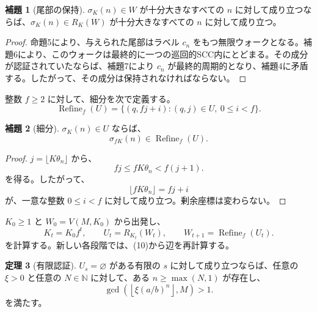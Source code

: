 \documentclass[11pt,reqno]{amsart}
\theoremstyle{definition}
\newtheorem{theorem}{定理}
\newtheorem{lemma}[theorem]{補題}
\theoremstyle{definition}
\theoremstyle{remark}
\begin{document}
\begin{samepage}
\begin{lemma}[尾部の保持]\leavevmode\label{thm:8}
\(\sigma_K(n)\in W\) が十分大きなすべての \(n\) に対して成り立つならば、\(\sigma_K(n)\in R_K(W)\) が十分大きなすべての \(n\) に対して成り立つ。
\label{thm-end:8}
\end{lemma}
\end{samepage}

\begin{proof}\leavevmode\label{proof:8}
命題5により、与えられた尾部はラベル \(c_n\) をもつ無限ウォークとなる。補題6により、このウォークは最終的に一つの巡回的SCC内にとどまる。その成分が認証されていたならば、補題7により \(c_n\) が最終的周期的となり、補題4に矛盾する。したがって、その成分は保持されなければならない。\qedhere
\end{proof}

整数 \(f\ge2\) に対して、細分を次で定義する。
\[
\operatorname{Refine}_f(U)
=\{(q,fj+i):(q,j)\in U,\ 0\le i<f\}.
\tag{16}\label{eq:16}
\]

\begin{samepage}
\begin{lemma}[細分]\leavevmode\label{thm:9}
\(\sigma_K(n)\in U\) ならば、
\[
\sigma_{fK}(n)\in\operatorname{Refine}_f(U).
\]
\label{thm-end:9}
\end{lemma}
\end{samepage}

\begin{proof}\leavevmode\label{proof:9}
\(j=\lfloor K\theta_n\rfloor\) から、
\[
fj\le fK\theta_n<f(j+1).
\]
を得る。したがって、
\[
\lfloor fK\theta_n\rfloor=fj+i
\]
が、一意な整数 \(0\le i<f\) に対して成り立つ。剰余座標は変わらない。\qedhere
\end{proof}

\(K_0\ge1\) と \(W_0=V(M,K_0)\) から出発し、
\[
K_t=K_0f^t,\qquad U_t=R_{K_t}(W_t),\qquad
W_{t+1}=\operatorname{Refine}_f(U_t).
\tag{17}\label{eq:17}
\]
を計算する。新しい各段階では、(10)から辺を再計算する。

\begin{samepage}
\begin{theorem}[有限認証]\leavevmode\label{thm:10}
\(U_s=\varnothing\) がある有限の \(s\) に対して成り立つならば、任意の \(\xi>0\) と任意の \(N\in\mathbb N\) に対して、ある \(n\ge\max(N,1)\) が存在し、
\[
\gcd\!\left(\left\lfloor\xi(a/b)^n\right\rfloor,M\right)>1.
\tag{18}\label{eq:18}
\]
を満たす。
\label{thm-end:10}
\end{theorem}
\end{samepage}
\end{document}
